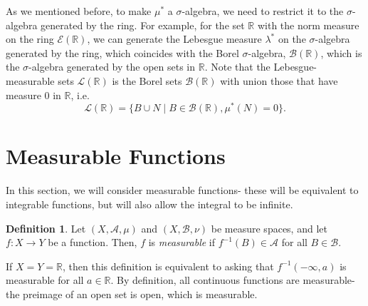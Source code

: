 \documentclass[a4paper, openany]{memoir}
\theoremstyle{definition}
\newtheorem{definition}{Definition}[section]
\theoremstyle{plain}
\begin{document}
    As we mentioned before, to make $\mu^*$ a $\sigma$-algebra, we need to restrict it to the $\sigma$-algebra generated by the ring. For example, for the set $\mathbb{R}$ with the norm measure on the ring $\mathcal{E}(\mathbb{R})$, we can generate the Lebesgue measure $\lambda^*$ on the $\sigma$-algebra generated by the ring, which coincides with the Borel $\sigma$-algebra, $\mathcal{B}(\mathbb{R})$, which is the $\sigma$-algebra generated by the open sets in $\mathbb{R}$. Note that the Lebesgue-measurable sets $\mathcal{L}(\mathbb{R})$ is the Borel sets $\mathcal{B}(\mathbb{R})$ with union those that have measure $0$ in $\mathbb{R}$, i.e.
    \[\mathcal{L}(\mathbb{R}) = \{B \cup N \mid B \in \mathcal{B}(\mathbb{R}), \mu^*(N) = 0\}.\]
    \newpage

    \section{Measurable Functions}
    In this section, we will consider measurable functions- these will be equivalent to integrable functions, but will also allow the integral to be infinite.
    \begin{definition}
        Let $(X, \mathcal{A}, \mu)$ and $(X, \mathcal{B}, \nu)$ be measure spaces, and let $f \colon X \to Y$ be a function. Then, $f$ is \emph{measurable} if $f^{-1}(B) \in \mathcal{A}$ for all $B \in \mathcal{B}$.
    \end{definition}
    \noindent If $X = Y = \mathbb{R}$, then this definition is equivalent to asking that $f^{-1}(-\infty, a)$ is measurable for all $a \in \mathbb{R}$. By definition, all continuous functions are measurable- the preimage of an open set is open, which is measurable.
\end{document}

